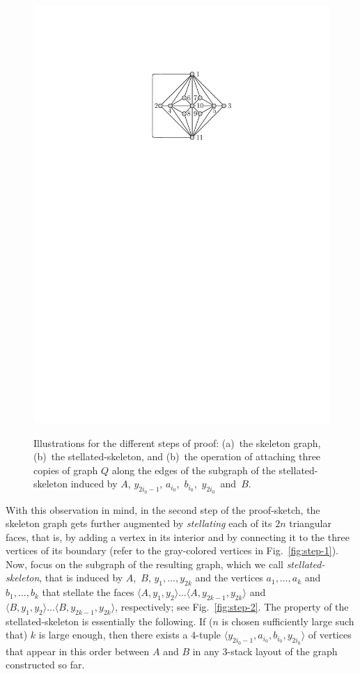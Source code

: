\documentclass[runningheads]{llncs}
\begin{document}
\begin{figure}[t]
	{\includegraphics[scale=0.86,page=6]{graphs}}
   \caption{%
   Illustrations for the different steps of proof: 
   (a)~the skeleton graph, 
   (b)~the stellated-skeleton, and
   (b)~the operation of attaching three copies of graph $Q$ 
   along the edges of the subgraph of the stellated-skeleton 
   induced by $A$, $y_{2i_0-1}$, $a_{i_0}$,~$b_{i_0}$,~$y_{2i_0}$~and~$B$.}
   \label{fig:yannakakis}
\end{figure}

With this observation in mind, in the second step of the proof-sketch, the skeleton graph gets further augmented by \emph{stellating} each of its $2n$ triangular faces, that is, by adding a vertex in its interior and by connecting it to the three vertices of its boundary (refer to the gray-colored vertices in Fig.~\ref{fig:step-1}). Now, focus on the subgraph of the resulting graph, which we call \emph{stellated-skeleton}, that is induced by $A$,~$B$, $y_1,\ldots,y_{2k}$ and the vertices $a_1,\ldots,a_k$ and $b_1,\ldots,b_k$ that stellate the faces $\langle A, y_1, y_2\rangle\ldots\langle A, y_{2k-1}, y_{2k}\rangle$ and $\langle B, y_1, y_2\rangle\ldots\langle B, y_{2k-1}, y_{2k}\rangle$, respectively; see Fig.~\ref{fig:step-2}. The property of the stellated-skeleton is essentially the following.  If ($n$ is chosen sufficiently large such that) $k$ is large enough, then there exists a $4$-tuple $\langle y_{2i_0-1}, a_{i_0}, b_{i_0}, y_{2i_0}\rangle$ of vertices that appear in this order between $A$ and $B$ in any $3$-stack layout of the graph constructed so far.
\end{document}

